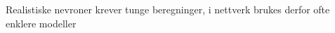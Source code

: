 \documentclass[presentation]{beamer}
\begin{document}
\begin{frame}{Realistiske nevroner krever tunge beregninger, i nettverk brukes derfor ofte enklere modeller}
\vspace{-10mm}
   \begin{figure}

\end{figure}
\end{frame}
\end{document}
